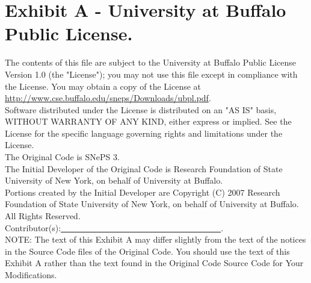 \documentclass[letterpaper,colorlinks=true,linkcolor=blue]{book}
\begin{document}
\section*{Exhibit A - University at Buffalo Public License.}
The contents of this file are subject to the University at Buffalo
Public License Version 1.0 (the "License"); you may not use this
file except in compliance with the License. You may obtain a copy of
the License at \url{http://www.cse.buffalo.edu/sneps/Downloads/ubpl.pdf}.\\

\noindent Software distributed under the License is distributed on an "AS IS"
basis, WITHOUT WARRANTY OF ANY KIND, either express or implied. See the
License for the specific language governing rights and limitations
under the License.\\

\noindent The Original Code is SNePS 3.\\

\noindent The Initial Developer of the Original Code is Research Foundation of State University of New York, on behalf of University at Buffalo.\\

\noindent Portions created by the Initial Developer are Copyright (C) 2007 Research Foundation of State University of New York, on behalf of University at Buffalo. All Rights Reserved.\\

\noindent Contributor(s):\underline{~~~~~~~~~~~~~~~~~~~~~~~~~~~~~~~~~~~~~~}.\\

\noindent NOTE: The text of this Exhibit A may differ slightly from the text of the notices in the Source Code files of the Original Code. You should use the text of this Exhibit A rather than the text found in the Original Code Source Code for Your Modifications.

\cleardoublepage
{}



\cleardoublepage
{}
\printindex
\end{document}
